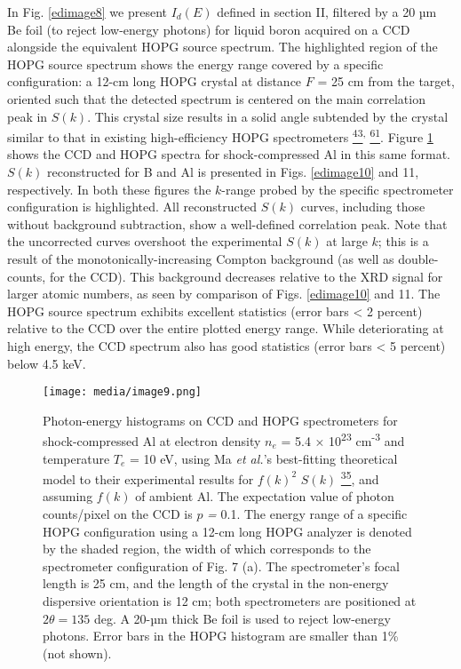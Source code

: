 In Fig. \ref{edimage8} we present \(I_{d}\left( E \right)\) defined in section II,
filtered by a 20 µm Be foil (to reject low-energy photons) for liquid
boron acquired on a CCD alongside the equivalent HOPG source spectrum.
The highlighted region of the HOPG source spectrum shows the energy
range covered by a specific configuration: a 12-cm long HOPG crystal at
distance \(F\) = 25 cm from the target, oriented such that the detected
spectrum is centered on the main correlation peak in \(S(k)\). This
crystal size results in a solid angle subtended by the crystal similar
to that in existing high-efficiency HOPG spectrometers
\hyperref[b.-yaakobi-2012-private-communication.]{\textsuperscript{43}}\textsuperscript{,}
\hyperref[a.-pak-g.-gregori-j.-knight-k.-campbell-d.-price-b.-hammel-o.-l.-landen-and-s.-h.-glenzer-review-of-scientific-instruments-75-3747-2004.]{\textsuperscript{61}}.
Figure \ref{edimage9} shows the CCD and HOPG spectra for shock-compressed Al in this
same format. \(S\left( k \right)\) reconstructed for B and Al is
presented in Figs. \ref{edimage10} and 11, respectively. In both these figures the
\(k\)-range probed by the specific spectrometer configuration is
highlighted. All reconstructed \(S\left( k \right)\) curves, including
those without background subtraction, show a well-defined correlation
peak. Note that the uncorrected curves overshoot the experimental
\(S\left( k \right)\) at large \(k\); this is a result of the
monotonically-increasing Compton background (as well as double-counts,
for the CCD). This background decreases relative to the XRD signal for
larger atomic numbers, as seen by comparison of Figs. \ref{edimage10} and 11. The
HOPG source spectrum exhibits excellent statistics (error bars
\textless{} 2 percent) relative to the CCD over the entire plotted
energy range. While deteriorating at high energy, the CCD spectrum also
has good statistics (error bars \textless{} 5 percent) below 4.5 keV.

\begin{figure}[h] \label{edimage9}
\caption{ Photon-energy histograms on
CCD and HOPG spectrometers for shock-compressed Al at electron density
\(n_{e}\) = 5.4 × 10\textsuperscript{23} cm\textsuperscript{-3} and
temperature \(T_{e}\) = 10 eV, using Ma \emph{et al.}'s best-fitting
theoretical model to their experimental results for \({f(k)}^{2}\)
\(S(k)\)
\hyperref[t.-ma-et-al.-physical-review-letters-110-065001-2013.]{\textsuperscript{35}},
and assuming \(f(k)\) of ambient Al. The expectation value of photon
counts/pixel on the CCD is \(p\) \emph{=} 0.1. The energy range of a
specific HOPG configuration using a 12-cm long HOPG analyzer is denoted
by the shaded region, the width of which corresponds to the spectrometer
configuration of Fig. 7 (a). The spectrometer's focal length is 25 cm,
and the length of the crystal in the non-energy dispersive orientation
is 12 cm; both spectrometers are positioned at \(2\theta = 135\) deg. A
20-µm thick Be foil is used to reject low-energy photons. Error bars in
the HOPG histogram are smaller than 1\% (not shown).}
\centering
\texttt{[image: media/image9.png]}
\end{figure}

